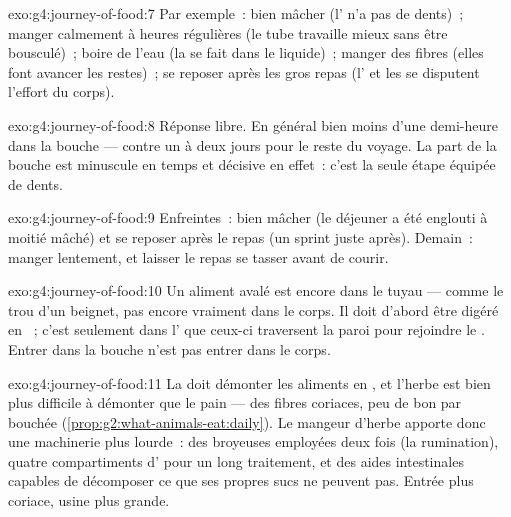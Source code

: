 \begin{solution}{exo:g4:journey-of-food:7}
Par exemple~: bien mâcher (l' n'a pas de dents)~; manger
calmement à heures régulières (le tube travaille mieux sans être
bousculé)~; boire de l'eau (la  se fait dans le liquide)~;
manger des fibres (elles font avancer les restes)~; se reposer après
les gros repas (l' et les  se disputent l'effort du
corps).
\end{solution}

\begin{solution}{exo:g4:journey-of-food:8}
Réponse libre. En général bien moins d'une demi-heure dans la bouche
--- contre un à deux jours pour le reste du voyage. La part de la
bouche est minuscule en temps et décisive en effet~: c'est la seule
étape équipée de dents.
\end{solution}

\begin{solution}{exo:g4:journey-of-food:9}
Enfreintes~: bien mâcher (le déjeuner a été englouti à moitié mâché)
et se reposer après le repas (un sprint juste après). Demain~:
manger lentement, et laisser le repas se tasser avant de courir.
\end{solution}

\begin{solution}{exo:g4:journey-of-food:10}
Un aliment avalé est encore dans le tuyau --- comme le trou d'un
beignet, pas encore vraiment dans le corps. Il doit d'abord être
digéré en ~; c'est seulement dans l' que
ceux-ci traversent la paroi pour rejoindre le . Entrer dans la
bouche n'est pas entrer dans le corps.
\end{solution}

\begin{solution}{exo:g4:journey-of-food:11}
La  doit démonter les aliments en , et l'herbe
est bien plus difficile à démonter que le pain --- des fibres
coriaces, peu de bon par bouchée
(\cref{prop:g2:what-animals-eat:daily}). Le mangeur d'herbe apporte
donc une machinerie plus lourde~: des  broyeuses employées
deux fois (la rumination), quatre compartiments d' pour un
long traitement, et des aides intestinales capables de décomposer ce
que ses propres sucs ne peuvent pas. Entrée plus coriace, usine plus
grande.
\end{solution}

